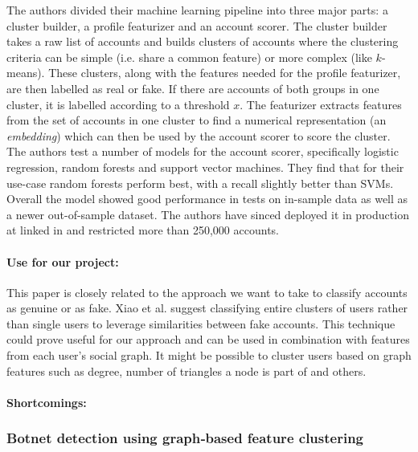 The authors divided their machine learning pipeline into three major parts: a cluster builder, a profile featurizer and an account scorer. The cluster builder takes a raw list of accounts and builds clusters of accounts where the clustering criteria can be simple (i.e. share a common feature) or more complex (like $k$-means). These clusters, along with the features needed for the profile featurizer, are then labelled as real or fake. If there are accounts of both groups in one cluster, it is labelled according to a threshold $x$. The featurizer extracts features from the set of accounts in one cluster to find a numerical representation (an \textit{embedding}) which can then be used by the account scorer to score the cluster. The authors test a number of models for the account scorer, specifically logistic regression, random forests and support vector machines. They find that for their use-case random forests perform best, with a recall slightly better than SVMs. Overall the model showed good performance in tests on in-sample data as well as a newer out-of-sample dataset. The authors have sinced deployed it in production at linked in and restricted more than 250,000 accounts.

\paragraph{Use for our project:}
This paper is closely related to the approach we want to take to classify accounts as genuine or as fake. Xiao et al. suggest classifying entire clusters of users rather than single users to leverage similarities between fake accounts. This technique could prove useful for our approach and can be used in combination with features from each user's social graph. It might be possible to cluster users based on graph features such as degree, number of triangles a node is part of and others.

\paragraph{Shortcomings:}

\subsubsection{Botnet detection using graph‐based feature clustering}

